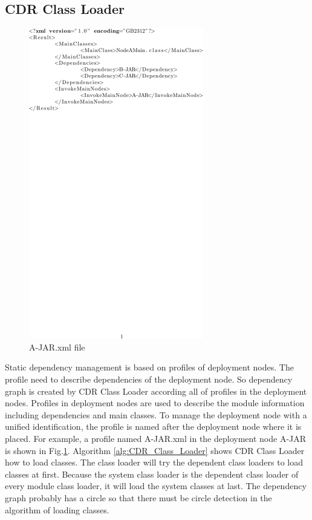 \documentclass[conference]{IEEEtran}
\begin{document}
\subsection{CDR Class Loader}

\begin{figure}[!t]
\centering
\includegraphics[width=3.0in]{xmlpicture.pdf}
\caption{A-JAR.xml file}
\label{fig:xml_pic}
\end{figure}

Static dependency management is based on profiles of deployment nodes.
The profile need to describe dependencies of the deployment node.
So dependency graph is created by CDR Class Loader according all of profiles in the deployment nodes.
Profiles in deployment nodes are used to describe the module information including dependencies and main classes.
To manage the deployment node with a unified identification, the profile is named after the deployment node where it is placed.
For example, a profile named A-JAR.xml in the deployment node A-JAR is shown in Fig.\ref{fig:xml_pic}.
Algorithm \ref{alg:CDR_Class_Loader} shows CDR Class Loader how to load classes.
The class loader will try the dependent class loaders to load classes at first.
Because the system class loader is the dependent class loader of every module class loader, it will load the system classes at last.
The dependency graph probably has a circle so that there must be circle detection in the algorithm of loading classes.
\end{document}
